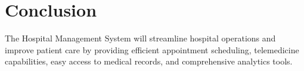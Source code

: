 \documentclass{article}
\begin{document}
\section{Conclusion}
The Hospital Management System will streamline hospital operations and improve patient care by providing efficient appointment scheduling, telemedicine capabilities, easy access to medical records, and comprehensive analytics tools.

\end{document}

